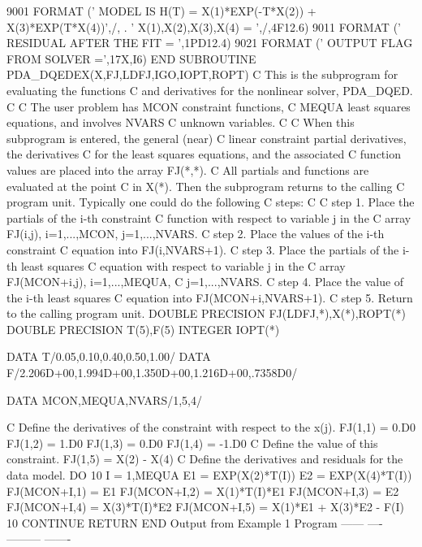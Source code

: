\documentclass[11pt,twoside,nolof]{starlink}
\begin{document}
\begin{terminalv}
 9001 FORMAT (' MODEL IS H(T) = X(1)*EXP(-T*X(2)) + X(3)*EXP(T*X(4))',/,
     .  ' X(1),X(2),X(3),X(4) = ',/,4F12.6)
 9011 FORMAT (' RESIDUAL AFTER THE FIT = ',1PD12.4)
 9021 FORMAT (' OUTPUT FLAG FROM SOLVER =',17X,I6)
      END
      SUBROUTINE PDA_DQEDEX(X,FJ,LDFJ,IGO,IOPT,ROPT)
C     This is the subprogram for evaluating the functions
C     and derivatives for the nonlinear solver, PDA_DQED.
C
C     The user problem has MCON constraint functions,
C     MEQUA least squares equations, and involves NVARS
C     unknown variables.
C
C     When this subprogram is entered, the general (near)
C     linear constraint partial derivatives, the derivatives
C     for the least squares equations, and the associated
C     function values are placed into the array FJ(*,*).
C     All partials and functions are evaluated at the point
C     in X(*).  Then the subprogram returns to the calling
C     program unit. Typically one could do the following
C     steps:
C
C     step 1. Place the partials of the i-th constraint
C             function with respect to variable j in the
C             array FJ(i,j), i=1,...,MCON, j=1,...,NVARS.
C     step 2. Place the values of the i-th constraint
C             equation into FJ(i,NVARS+1).
C     step 3. Place the partials of the i-th least squares
C             equation with respect to variable j in the
C             array FJ(MCON+i,j), i=1,...,MEQUA,
C             j=1,...,NVARS.
C     step 4. Place the value of the i-th least squares
C             equation into FJ(MCON+i,NVARS+1).
C     step 5. Return to the calling program unit.
      DOUBLE PRECISION FJ(LDFJ,*),X(*),ROPT(*)
      DOUBLE PRECISION T(5),F(5)
      INTEGER IOPT(*)

      DATA T/0.05,0.10,0.40,0.50,1.00/
      DATA F/2.206D+00,1.994D+00,1.350D+00,1.216D+00,.7358D0/

      DATA MCON,MEQUA,NVARS/1,5,4/

C     Define the derivatives of the constraint with respect to the x(j).
      FJ(1,1) = 0.D0
      FJ(1,2) = 1.D0
      FJ(1,3) = 0.D0
      FJ(1,4) = -1.D0
C     Define the value of this constraint.
      FJ(1,5) = X(2) - X(4)
C     Define the derivatives and residuals for the data model.
      DO 10 I = 1,MEQUA
         E1 = EXP(X(2)*T(I))
         E2 = EXP(X(4)*T(I))
         FJ(MCON+I,1) = E1
         FJ(MCON+I,2) = X(1)*T(I)*E1
         FJ(MCON+I,3) = E2
         FJ(MCON+I,4) = X(3)*T(I)*E2
         FJ(MCON+I,5) = X(1)*E1 + X(3)*E2 - F(I)
   10 CONTINUE
      RETURN
      END
  Output from Example 1 Program
  ------ ---- --------- -------


\end{terminalv}
\end{document}

